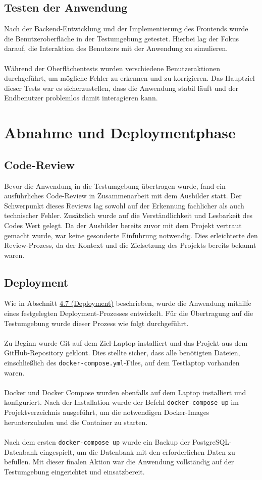 \documentclass[a4paper,12pt]{article}
\begin{document}
\subsection{Testen der Anwendung}
Nach der Backend-Entwicklung und der Implementierung des Frontends wurde die Benutzeroberfläche in der Testumgebung getestet. Hierbei lag der Fokus darauf, die Interaktion des Benutzers mit der Anwendung zu simulieren. \\
\\
Während der Oberflächentests wurden verschiedene Benutzeraktionen durchgeführt, um mögliche Fehler zu erkennen und zu korrigieren. Das Hauptziel dieser Tests war es sicherzustellen, dass die Anwendung stabil läuft und der Endbenutzer problemlos damit interagieren kann.

\section{Abnahme und Deploymentphase}
\subsection{Code-Review}
Bevor die Anwendung in die Testumgebung übertragen wurde, fand ein ausführliches Code-Review in Zusammenarbeit mit dem Ausbilder statt. Der Schwerpunkt dieses Reviews lag sowohl auf der Erkennung fachlicher als auch technischer Fehler. Zusätzlich wurde auf die Verständlichkeit und Lesbarkeit des Codes Wert gelegt. Da der Ausbilder bereits zuvor mit dem Projekt vertraut gemacht wurde, war keine gesonderte Einführung notwendig. Dies erleichterte den Review-Prozess, da der Kontext und die Zielsetzung des Projekts bereits bekannt waren.

\subsection{Deployment}

Wie in Abschnitt \hyperref[sec:deployment]{4.7 (Deployment)} beschrieben, wurde die Anwendung mithilfe eines festgelegten Deployment-Prozesses entwickelt. Für die Übertragung auf die Testumgebung wurde dieser Prozess wie folgt durchgeführt.\\
\\
Zu Beginn wurde Git auf dem Ziel-Laptop installiert und das Projekt aus dem GitHub-Repository geklont. Dies stellte sicher, dass alle benötigten Dateien, einschließlich des \texttt{docker-compose.yml}-Files, auf dem Testlaptop vorhanden waren.\\
\\
Docker und Docker Compose wurden ebenfalls auf dem Laptop installiert und konfiguriert. Nach der Installation wurde der Befehl \texttt{docker-compose up} im Projektverzeichnis ausgeführt, um die notwendigen Docker-Images herunterzuladen und die Container zu starten.\\
\\
Nach dem ersten \texttt{docker-compose up} wurde ein Backup der PostgreSQL-Datenbank eingespielt, um die Datenbank mit den erforderlichen Daten zu befüllen. Mit dieser finalen Aktion war die Anwendung vollständig auf der Testumgebung eingerichtet und einsatzbereit.
\end{document}
